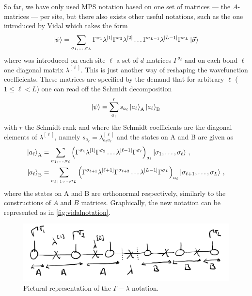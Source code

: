         So far, we have only used MPS notation based on one set of matrices --- the $A$-matrices --- per site, but there also exists other useful notations, such as the one introduced by Vidal which takes the form
        \begin{equation}
            \ket{\psi}=\sum_{\sigma_1,\dots,\sigma_L}\Gamma^{\sigma_1}\lambda^{[1]}\Gamma^{\sigma_2}\lambda^{[2]}\dots\Gamma^{\sigma_{L-1}}\lambda^{[L-1]}\Gamma^{\sigma_L}\ket{\vec{\sigma}}
        \end{equation}
        where was introduced on each site $\ell$ a set of $d$ matrices $\Gamma^{\sigma_{\ell}}$ and on each bond $\ell$ one diagonal matrix $\lambda^{[\ell]}$. This is just another way of reshaping the wavefunction coefficients. These matrices are specified by the demand that for arbitrary $\ell$ ($1\leq \ell<L$) one can read off the Schmidt decomposition
        \begin{equation}
            \ket{\psi}=\sum_{a_{\ell}}^rs_{a_{\ell}}\ket{a_{\ell}}_\text{A}\ket{a_{\ell}}_\text{B}
        \end{equation}
        with $r$ the Schmidt rank and where the Schmidt coefficients are the diagonal elements of $\lambda^{[\ell]}$, namely $s_{a_{\ell}}=\lambda^{[\ell]}_{a_{\ell} a_{\ell}}$ and the states on A and B are given as
        \begin{align*}
            \ket{a_{\ell}}_\text{A}&=\sum_{\sigma_1,\dots,\sigma_{\ell}}\left(\Gamma^{\sigma_1}\lambda^{[1]}\Gamma^{\sigma_2}\dots\lambda^{[\ell-1]}\Gamma^{\sigma_{\ell}}\right)_{a_{\ell}}\ket{\sigma_1,\dots,\sigma_{\ell}}\,,\\
            \ket{a_{\ell}}_\text{B}&=\sum_{\sigma_{\ell+1},\dots,\sigma_L}\left(\Gamma^{\sigma_{\ell+1}}\lambda^{[\ell+1]}\Gamma^{\sigma_{\ell+2}}\dots\lambda^{[L-1]}\Gamma^{\sigma_{L}}\right)_{a_{\ell}}\ket{\sigma_{\ell+1},\dots,\sigma_{L}}\,,
        \end{align*}
        where the states on A and B are orthonormal respectively, similarly to the constructions of $A$ and $B$ matrices. Graphically, the new notation can be represented as in \autoref{fig:vidalnotation}.

        \begin{figure}[!h]
            \centering
            \includegraphics[scale=0.2]{graphs/vidalnotation.png}
            \caption{Pictural representation of the $\Gamma-\lambda$ notation.}
            \label{fig:vidalnotation}
        \end{figure}

